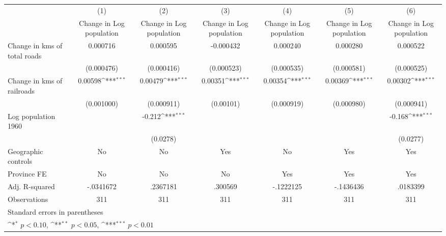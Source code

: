 {
\def\sym#1{\ifmmode^{#1}\else\(^{#1}\)\fi}
\begin{tabular}{l*{6}{c}}
\hline\hline
                    &\multicolumn{1}{c}{(1)}&\multicolumn{1}{c}{(2)}&\multicolumn{1}{c}{(3)}&\multicolumn{1}{c}{(4)}&\multicolumn{1}{c}{(5)}&\multicolumn{1}{c}{(6)}\\
                    &\multicolumn{1}{c}{Change in Log population}&\multicolumn{1}{c}{Change in Log population}&\multicolumn{1}{c}{Change in Log population}&\multicolumn{1}{c}{Change in Log population}&\multicolumn{1}{c}{Change in Log population}&\multicolumn{1}{c}{Change in Log population}\\
\hline
Change in kms of total roads&    0.000716         &    0.000595         &   -0.000432         &    0.000240         &    0.000280         &    0.000522         \\
                    &  (0.000476)         &  (0.000416)         &  (0.000523)         &  (0.000535)         &  (0.000581)         &  (0.000525)         \\
[1em]
Change in kms of railroads&     0.00598\sym{***}&     0.00479\sym{***}&     0.00351\sym{***}&     0.00354\sym{***}&     0.00369\sym{***}&     0.00302\sym{***}\\
                    &  (0.001000)         &  (0.000911)         &   (0.00101)         &  (0.000919)         &  (0.000980)         &  (0.000941)         \\
[1em]
Log population 1960 &                     &      -0.212\sym{***}&                     &                     &                     &      -0.168\sym{***}\\
                    &                     &    (0.0278)         &                     &                     &                     &    (0.0277)         \\
\hline
Geographic controls &          No         &          No         &         Yes         &          No         &         Yes         &         Yes         \\
Province FE         &          No         &          No         &          No         &         Yes         &         Yes         &         Yes         \\
Adj. R-squared      &   -.0341672         &    .2367181         &     .300569         &   -.1222125         &   -.1436436         &    .0183399         \\
Observations        &         311         &         311         &         311         &         311         &         311         &         311         \\
\hline\hline
\multicolumn{7}{l}{\footnotesize Standard errors in parentheses}\\
\multicolumn{7}{l}{\footnotesize \sym{*} \(p<0.10\), \sym{**} \(p<0.05\), \sym{***} \(p<0.01\)}\\
\end{tabular}
}
